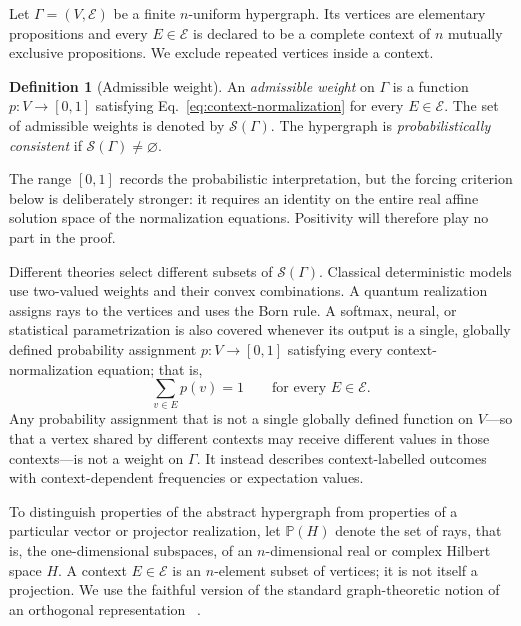 \documentclass[
  twocolumn,
  aps,
  pra,
  floatfix,
  amsmath,amssymb,
  longbibliography
]{revtex4-2}
\theoremstyle{definition}
\newtheorem{definition}[theorem]{Definition}
\theoremstyle{remark}
\newcommand{\E}{\mathcal E}
\newcommand{\Pc}{\mathbb P}
\begin{document}
Let $\Gamma=(V,\E)$ be a finite $n$-uniform hypergraph.  Its vertices are
elementary propositions and every $E\in\E$ is declared to be a complete
context of $n$ mutually exclusive propositions.  We exclude repeated
vertices inside a context.

\begin{definition}[Admissible weight]
An \emph{admissible weight} on $\Gamma$ is a function
$p:V\to[0,1]$ satisfying Eq.~\eqref{eq:context-normalization} for every
$E\in\E$.  The set of admissible weights is denoted by $\mathcal S(\Gamma)$.
The hypergraph is \emph{probabilistically consistent} if
$\mathcal S(\Gamma)\ne\varnothing$.
\end{definition}

The range $[0,1]$ records the probabilistic interpretation, but the forcing
criterion below is deliberately stronger: it requires an identity on the
entire real affine solution space of the normalization equations.  Positivity
will therefore play no part in the proof.

Different theories select different subsets of $\mathcal S(\Gamma)$.
Classical deterministic models use two-valued weights and their convex
combinations.  A quantum realization assigns rays to the vertices and uses
the Born rule. A softmax, neural, or statistical parametrization is also covered whenever
its output is a single, globally defined probability assignment
$p:V\to[0,1]$ satisfying every context-normalization equation; that is,
\[
 \sum_{v\in E}p(v)=1
 \qquad\text{for every }E\in\E.
\]
Any probability assignment that is not a single globally defined function
on $V$---so that a vertex shared by different contexts may receive
different values in those contexts---is not a weight on $\Gamma$.  It
instead describes context-labelled outcomes with context-dependent
frequencies or expectation values.

To distinguish properties of the abstract hypergraph from properties of a
particular vector or projector realization, let $\Pc(H)$ denote the set of
rays, that is, the one-dimensional subspaces, of an $n$-dimensional real or
complex Hilbert space $H$.  A context $E\in\E$ is an $n$-element subset of
vertices; it is not itself a projection.  We use the faithful version of the
standard graph-theoretic notion of an orthogonal representation
~\cite{lovasz-79,lovasz-89,Portillo-2015}.
\end{document}
